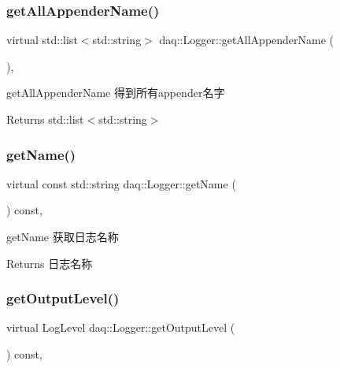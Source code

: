 \subsubsection{\texorpdfstring{get\+All\+Appender\+Name()}{getAllAppenderName()}}
{\footnotesize\ttfamily virtual std\+::list$<$std\+::string$>$ daq\+::\+Logger\+::get\+All\+Appender\+Name (\begin{DoxyParamCaption}{ }\end{DoxyParamCaption})\hspace{0.3cm}{\ttfamily [inline]}, {\ttfamily [virtual]}}



get\+All\+Appender\+Name 得到所有appender名字 

\begin{DoxyReturn}{Returns}
std\+::list$<$std\+::string$>$ 
\end{DoxyReturn}
\mbox{\label{classdaq_1_1Logger_af73ff307b7834b731cf6cc17148a36e5}} 
\subsubsection{\texorpdfstring{get\+Name()}{getName()}}
{\footnotesize\ttfamily virtual const std\+::string daq\+::\+Logger\+::get\+Name (\begin{DoxyParamCaption}{ }\end{DoxyParamCaption}) const\hspace{0.3cm}{\ttfamily [inline]}, {\ttfamily [virtual]}}



get\+Name 获取日志名称 

\begin{DoxyReturn}{Returns}
日志名称 
\end{DoxyReturn}
\mbox{\label{classdaq_1_1Logger_a25447b37351baad0044153f25919430a}} 
\subsubsection{\texorpdfstring{get\+Output\+Level()}{getOutputLevel()}}
{\footnotesize\ttfamily virtual Log\+Level daq\+::\+Logger\+::get\+Output\+Level (\begin{DoxyParamCaption}{ }\end{DoxyParamCaption}) const\hspace{0.3cm}{\ttfamily [inline]}, {\ttfamily [virtual]}}



